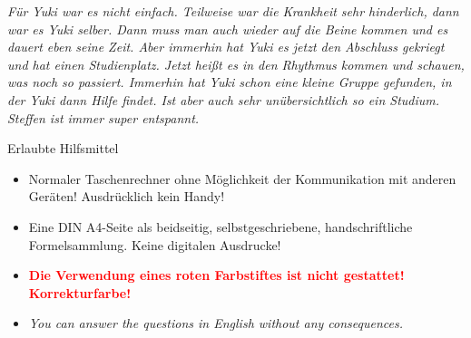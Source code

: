 \documentclass[a4paper, 9pt]{scrartcl}\usepackage[]{graphicx}\usepackage[]{xcolor}
\begin{document}
\begin{minipage}[c]{0.875\textwidth}
\textit{Für Yuki war es nicht einfach. Teilweise war die Krankheit sehr hinderlich, dann war es Yuki selber. Dann muss man auch wieder auf die Beine kommen und es dauert eben seine Zeit. Aber immerhin hat Yuki es jetzt den Abschluss gekriegt und hat einen Studienplatz. Jetzt heißt es in den Rhythmus kommen und schauen, was noch so passiert. Immerhin hat Yuki schon eine kleine Gruppe gefunden, in der Yuki dann Hilfe findet. Ist aber auch sehr unübersichtlich so ein Studium. Steffen ist immer super entspannt.}
\end{minipage}
\clearpage


\begin{graybox}{Erlaubte Hilfsmittel}
  \vspace{1Ex}
  \begin{itemize}
  \item Normaler Taschenrechner ohne Möglichkeit der Kommunikation mit anderen
    Geräten! Ausdrücklich kein Handy!
  \item Eine DIN A4-Seite als beidseitig, selbstgeschriebene,
    handschriftliche Formelsammlung. Keine digitalen Ausdrucke! 
  \item \textbf{\textcolor{red}{Die Verwendung eines roten Farbstiftes ist nicht gestattet! Korrekturfarbe!}}
  \item \textit{You can answer the questions in English without any consequences.}  
  \end{itemize}
\end{graybox}
\vfill
\end{document}
